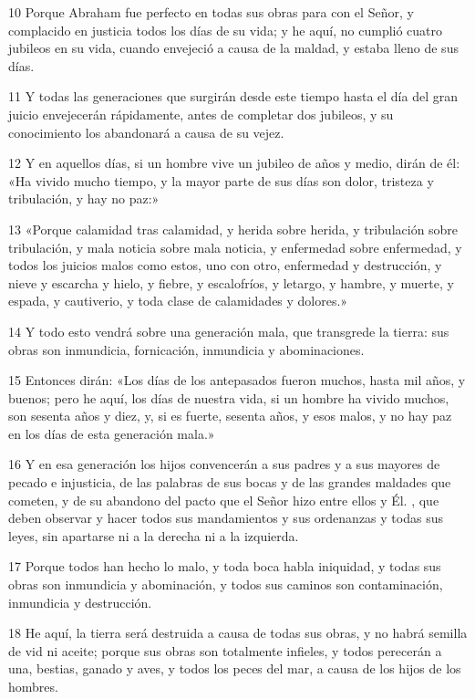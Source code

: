 \par 10 Porque Abraham fue perfecto en todas sus obras para con el Señor, y complacido en justicia todos los días de su vida; y he aquí, no cumplió cuatro jubileos en su vida, cuando envejeció a causa de la maldad, y estaba lleno de sus días.
\par 11 Y todas las generaciones que surgirán desde este tiempo hasta el día del gran juicio envejecerán rápidamente, antes de completar dos jubileos, y su conocimiento los abandonará a causa de su vejez.
\par 12 Y en aquellos días, si un hombre vive un jubileo de años y medio, dirán de él: «Ha vivido mucho tiempo, y la mayor parte de sus días son dolor, tristeza y tribulación, y hay no paz:»
\par 13 «Porque calamidad tras calamidad, y herida sobre herida, y tribulación sobre tribulación, y mala noticia sobre mala noticia, y enfermedad sobre enfermedad, y todos los juicios malos como estos, uno con otro, enfermedad y destrucción, y nieve y escarcha y hielo, y fiebre, y escalofríos, y letargo, y hambre, y muerte, y espada, y cautiverio, y toda clase de calamidades y dolores.»
\par 14 Y todo esto vendrá sobre una generación mala, que transgrede la tierra: sus obras son inmundicia, fornicación, inmundicia y abominaciones.
\par 15 Entonces dirán: «Los días de los antepasados ​​fueron muchos, hasta mil años, y buenos; pero he aquí, los días de nuestra vida, si un hombre ha vivido muchos, son sesenta años y diez, y, si es fuerte, sesenta años, y esos malos, y no hay paz en los días de esta generación mala.»
\par 16 Y en esa generación los hijos convencerán a sus padres y a sus mayores de pecado e injusticia, de las palabras de sus bocas y de las grandes maldades que cometen, y de su abandono del pacto que el Señor hizo entre ellos y Él. , que deben observar y hacer todos sus mandamientos y sus ordenanzas y todas sus leyes, sin apartarse ni a la derecha ni a la izquierda.
\par 17 Porque todos han hecho lo malo, y toda boca habla iniquidad, y todas sus obras son inmundicia y abominación, y todos sus caminos son contaminación, inmundicia y destrucción.
\par 18 He aquí, la tierra será destruida a causa de todas sus obras, y no habrá semilla de vid ni aceite; porque sus obras son totalmente infieles, y todos perecerán a una, bestias, ganado y aves, y todos los peces del mar, a causa de los hijos de los hombres.

